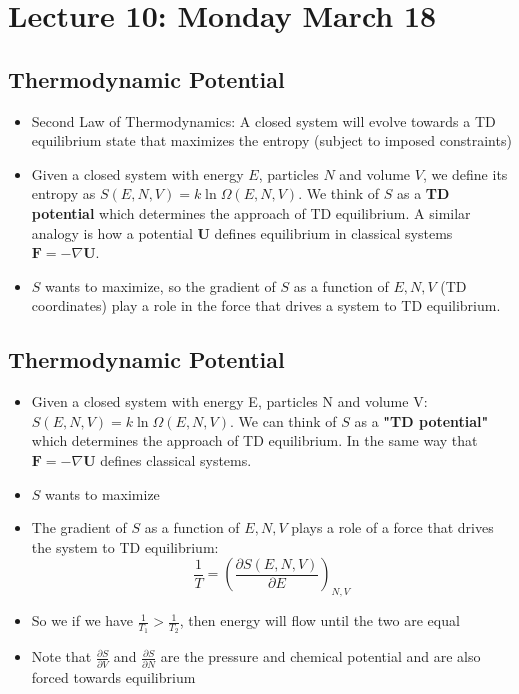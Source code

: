 \documentclass[8pt]{article}
\begin{document}
\section{Lecture 10: Monday March 18}
\subsection{Thermodynamic Potential}
\begin{itemize}
    \item Second Law of Thermodynamics: A closed system will evolve towards a TD equilibrium state that maximizes the entropy (subject to imposed constraints) 
    \item Given a closed system with energy $E$, particles $N$ and volume $V$, we define its entropy as  $S(E, N,V) = k \ln \Omega (E, N,V)$. We think of $S$  as a \textbf{TD potential} which determines the approach of TD equilibrium. A similar analogy is how a potential $\mathbf{U}$ defines equilibrium in classical systems $\mathbf{F} = - \nabla \mathbf{U}$. 
    \item $S$ wants to maximize, so the gradient of $S$ as a function of $E, N,V$ (TD coordinates) play a role in the force that drives a system to TD equilibrium. 



\end{itemize}

\subsection{Thermodynamic Potential}
\begin{itemize}
    \item Given a closed system with energy E, particles N and volume V: $S(E, N,V) = k \ln \Omega (E, N,V)$. We can think of $S$ as a \textbf{"TD potential"} which determines the approach of TD equilibrium. In the same way that $\mathbf{F} = - \nabla \mathbf{U}$ defines classical systems. 
    \item $S$ wants to maximize
    \item The gradient of $S$ as a function of $E, N,V$ plays a role of a force that drives the system to TD equilibrium: \[ \frac{1}{T} = \left(\frac{\partial S(E,N,V)}{\partial E}\right)_{N,V}\] 
    \item So we if we have $\frac{1}{T_1}> \frac{1}{T_2}$, then energy will flow until the two are equal 
    \item Note that $\frac{\partial S}{\partial V}$ and $\frac{\partial S}{\partial N}$ are the pressure and chemical potential and are also forced towards equilibrium
\end{itemize}
\end{document}
